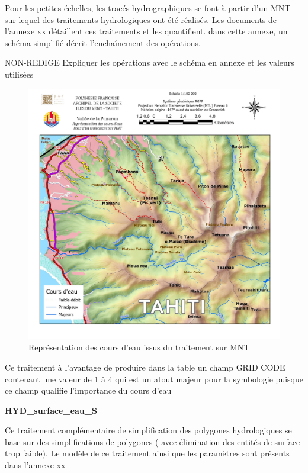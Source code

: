 Pour les petites échelles, les tracés hydrographiques se font à partir d'un MNT sur lequel des traitements hydrologiques ont été réalisés. Les documents de l'annexe xx détaillent ces traitements et les quantifient. dans cette annexe, un schéma simplifié décrit l'enchaînement des opérations.

{\color{magenta} NON-REDIGE Expliquer les opérations avec le schéma en annexe et les valeurs utilisées}
\begin{figure}[ht]
\centering
\includegraphics[scale=0.7]{images/chap1/carte_eau.jpg}
\caption{Représentation des cours d'eau issus du traitement sur MNT}
\label{carte_eau}
\end{figure}
Ce traitement à l'avantage de produire dans la table un champ GRID CODE contenant une valeur de 1 à 4 qui est un atout majeur pour la symbologie puisque ce champ qualifie l'importance du cours d'eau 

\begin{center}
    \footnotesize
    \textbf{HYD\_surface\_eau\_S}
\end{center}
Ce traitement complémentaire de simplification des polygones hydrologiques se base sur des simplifications de polygones ( avec élimination des entités de surface trop faible). Le modèle de ce traitement ainsi que les paramètres sont présents dans l'annexe xx

